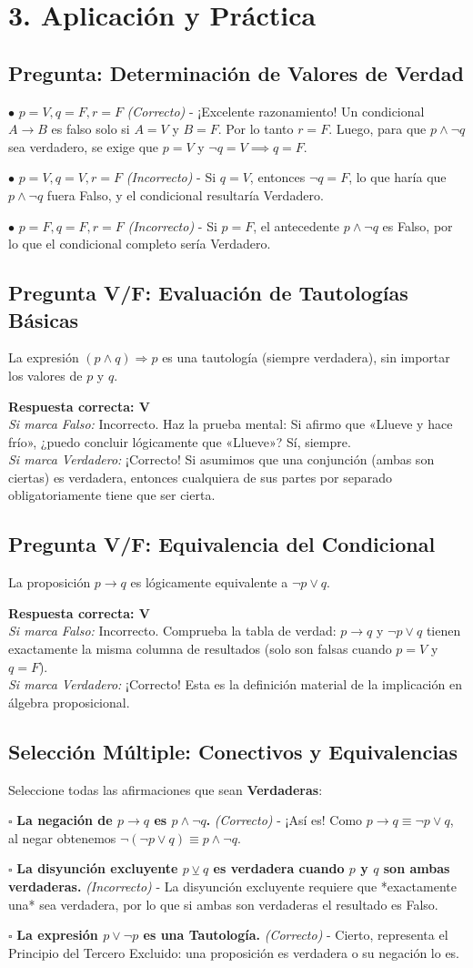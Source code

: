 \documentclass[11pt]{article}
\newenvironment{aplicacion}{\section*{3. Aplicación y Práctica}}{}
\newenvironment{preguntaalternativas}[1]{\subsection*{Pregunta: #1}\par\vspace{0.1cm}}{\vspace{0.3cm}}
\newcommand{\opcion}[3]{\par\noindent $\bullet$ \textbf{#1} \textit{(#2)} - #3\par\vspace{0.15cm}}
\newenvironment{preguntaverdaderofalso}[1]{\subsection*{Pregunta V/F: #1}\par\vspace{0.1cm}}{\vspace{0.3cm}}
\newcommand{\verdaderofalso}[3]{\par\noindent\textbf{Respuesta correcta: #1} \\ \textit{Si marca Falso:} #2 \\ \textit{Si marca Verdadero:} #3\par\vspace{0.15cm}}
\newenvironment{preguntacasillas}[1]{\subsection*{Selección Múltiple: #1}\par\vspace{0.1cm}}{\vspace{0.3cm}}
\newcommand{\casilla}[3]{\par\noindent $\square$ \textbf{#1} \textit{(#2)} - #3\par\vspace{0.15cm}}
\begin{document}
\begin{aplicacion}
\begin{preguntaalternativas}{Determinación de Valores de Verdad}
    \opcion{$p = V, q = F, r = F$}{Correcto}{¡Excelente razonamiento! Un condicional $A \rightarrow B$ es falso solo si $A = V$ y $B = F$. Por lo tanto $r = F$. Luego, para que $p \wedge \neg q$ sea verdadero, se exige que $p = V$ y $\neg q = V \implies q = F$.}
    \opcion{$p = V, q = V, r = F$}{Incorrecto}{Si $q = V$, entonces $\neg q = F$, lo que haría que $p \wedge \neg q$ fuera Falso, y el condicional resultaría Verdadero.}
    \opcion{$p = F, q = F, r = F$}{Incorrecto}{Si $p = F$, el antecedente $p \wedge \neg q$ es Falso, por lo que el condicional completo sería Verdadero.}
  \end{preguntaalternativas}

  \begin{preguntaverdaderofalso}{Evaluación de Tautologías Básicas}
    La expresión $(p \wedge q) \Rightarrow p$ es una tautología (siempre verdadera), sin importar los valores de $p$ y $q$.
    \verdaderofalso{V}
      {Incorrecto. Haz la prueba mental: Si afirmo que «Llueve y hace frío», ¿puedo concluir lógicamente que «Llueve»? Sí, siempre.}
      {¡Correcto! Si asumimos que una conjunción (ambas son ciertas) es verdadera, entonces cualquiera de sus partes por separado obligatoriamente tiene que ser cierta.}
  \end{preguntaverdaderofalso}

  \begin{preguntaverdaderofalso}{Equivalencia del Condicional}
    La proposición $p \rightarrow q$ es lógicamente equivalente a $\neg p \vee q$.
    \verdaderofalso{V}
      {Incorrecto. Comprueba la tabla de verdad: $p \rightarrow q$ y $\neg p \vee q$ tienen exactamente la misma columna de resultados (solo son falsas cuando $p=V$ y $q=F$).}
      {¡Correcto! Esta es la definición material de la implicación en álgebra proposicional.}
  \end{preguntaverdaderofalso}

  \begin{preguntacasillas}{Conectivos y Equivalencias}
    Seleccione todas las afirmaciones que sean \textbf{Verdaderas}:
    
    \casilla{La negación de $p \rightarrow q$ es $p \wedge \neg q$.}{Correcto}{¡Así es! Como $p \rightarrow q \equiv \neg p \vee q$, al negar obtenemos $\neg(\neg p \vee q) \equiv p \wedge \neg q$.}
    \casilla{La disyunción excluyente $p \veebar q$ es verdadera cuando $p$ y $q$ son ambas verdaderas.}{Incorrecto}{La disyunción excluyente requiere que *exactamente una* sea verdadera, por lo que si ambas son verdaderas el resultado es Falso.}
    \casilla{La expresión $p \vee \neg p$ es una Tautología.}{Correcto}{Cierto, representa el Principio del Tercero Excluido: una proposición es verdadera o su negación lo es.}
  \end{preguntacasillas}


\end{aplicacion}
\end{document}
